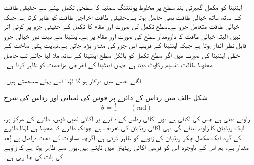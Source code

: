 اینٹینا کو مکمل گھیرتی بند سطح پر مخلوط پوئنٹنگ سمتیہ کا سطحی تکمل لینے سے حقیقی طاقت کے ساتھ ساتھ خیالی طاقت بھی حاصل ہوتا ہے۔حقیقی طاقت اخراجی طاقت کو ظاہر کرتا ہے جبکہ خیالی طاقت  متعامل جزو ہے۔سطح تکمل کی صورت اور مقام کا تکمل کے حقیقی جزو پر کوئی اثر نہیں البتہ خیالی طاقت کا دارومدار سطح کی صورت اور مقام پر ہے۔اینٹینا سے بہت دور خیالی جزو قابل نظر انداز ہوتا ہے جبکہ اینٹینا کے قریب اس جزو کی مقدار بڑھ جاتی ہے۔نہایت پتلی ساخت کے خطی اینٹینا کی صورت میں اگر سطح تکمل کو بالکل سطح اینٹینا کے ساتھ ملا لیا جائے تب حاصل مخلوط طاقت تقسیم  رکاوٹ  دیتا ہے جہاں  اینٹینا کے اخراجی مزاحمت کو ظاہر کرتا ہے۔

اگلے حصے میں  درکار ہو گا لہٰذا اسے پہلے سمجھتے ہیں۔

شکل -الف میں رداس  کے دائرے پر قوس کی لمبائی  اور  رداس  کی شرح
\begin{align}\label{مساوات_اینٹینا_ریڈیئن_تعریف}
\theta=\frac{l}{r} \quad \quad (\si{\radian})
\end{align}
 زاویے  دیتی ہے جس کی اکائی   ہے۔یوں اکائی رداس کے دائرے پر اکائی لمبی قوس، دائرے کے مرکز پر، ایک ریڈیئن  کا زاویہ بنائے گی۔یہی اکائی ریڈیئن کی تعریف ہے۔چونکہ دائرے کا محیط  ہے لہٰذا دائرے کے گرد ایک مکمل چکر  ریڈیئن  کے زاویے کو ظاہر کرتی ہے۔اگرچہ مساوات  کے تحت  دراصل بے بُعد مقدار ہے، ہم اس کے باوجود اس کو فرضی اکائی ریڈیئن میں ناپتے ہیں۔یوں  سے ظاہر ہوتا ہے کہ  زاویے کی بات کی جا رہی ہے۔

